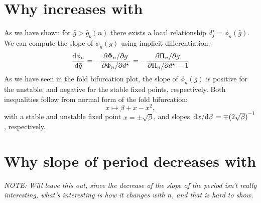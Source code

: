 \documentclass[12pt,authoryear]{elsarticle}
\newcommand{\dstar}{d^\star}
\newcommand{\gbar}{\bar g}
\newcommand{\phin}{\phi_n}
\newcommand{\Phin}{\Phi_n}
\renewcommand{\P}{\Pi_n}
\begin{document}
\section*{Why \boldmath{$\dstar_{f}$} increases with \boldmath{$\gbar$}}
As we have shown for $\gbar>\gbar_{b}(n)$ there exists a local relationship $\dstar_{f}=\phi_{n}(\gbar)$.
We can compute the slope of $\phi_{n}(\gbar)$ using implicit differentiation:
\begin{equation}
  \dv{\phin}{\gbar} = -\frac{\pdv*{\Phin}{\gbar}}{\pdv*{\Phin}{\dstar}}=
  -\frac{\pdv*{\P}{\gbar}}{\pdv*{\P}{\dstar}-1}
\end{equation}
As we have seen in the fold bifurcation plot, the slope of $\phin(\gbar)$ is positive for the unstable, and negative for the stable fixed points, respectively.
Both inequalities follow from normal form of the fold bifurcation:
\begin{equation}
x\mapsto \beta+x-x^{2},
\end{equation}
with a stable and unstable fixed point $x=\pm\sqrt{\beta}$, and slopes $\dv*{x}{\beta}=\mp {(2\sqrt{\beta})}^{-1}$, respectively.


\section*{Why slope of period decreases with \boldmath{$\gbar$}}
\emph{NOTE: Will leave this out, since the decrease of the slope of the period isn't really interesting, what's interesting is how it changes with $n$, and that is hard to show.}
\end{document}
